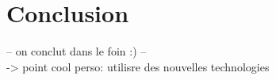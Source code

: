 \section{Conclusion}

-- on conclut dans le foin :) --\\

->  point cool perso: utilisre des nouvelles technologies \\